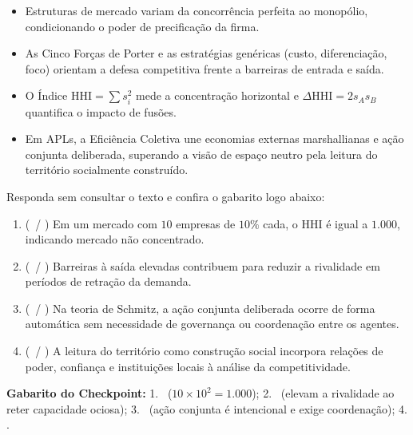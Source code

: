 \begin{boxResumo}
\begin{itemize}[leftmargin=1.4em, itemsep=2pt]
  \item Estruturas de mercado variam da concorrência perfeita ao monopólio, condicionando o poder de precificação da firma.
  \item As Cinco Forças de Porter e as estratégias genéricas (custo, diferenciação, foco) orientam a defesa competitiva frente a barreiras de entrada e saída.
  \item O Índice $\text{HHI} = \sum s_i^2$ mede a concentração horizontal e $\Delta \text{HHI} = 2 s_A s_B$ quantifica o impacto de fusões.
  \item Em APLs, a Eficiência Coletiva une economias externas marshallianas e ação conjunta deliberada, superando a visão de espaço neutro pela leitura do território socialmente construído.
\end{itemize}
\end{boxResumo}

\begin{boxTeste}
Responda sem consultar o texto e confira o gabarito logo abaixo:
\begin{enumerate}[leftmargin=1.4em, itemsep=3pt]
  \item (\V\ / \F) Em um mercado com $10$ empresas de $10\%$ cada, o $\text{HHI}$ é igual a $1.000$, indicando mercado não concentrado.
  \item (\V\ / \F) Barreiras à saída elevadas contribuem para reduzir a rivalidade em períodos de retração da demanda.
  \item (\V\ / \F) Na teoria de Schmitz, a ação conjunta deliberada ocorre de forma automática sem necessidade de governança ou coordenação entre os agentes.
  \item (\V\ / \F) A leitura do território como construção social incorpora relações de poder, confiança e instituições locais à análise da competitividade.
\end{enumerate}
\vspace{4pt}
\textbf{Gabarito do Checkpoint:} 1. \V\ ($10 \times 10^2 = 1.000$); 2. \F\ (elevam a rivalidade ao reter capacidade ociosa); 3. \F\ (ação conjunta é intencional e exige coordenação); 4. \V.
\end{boxTeste}
